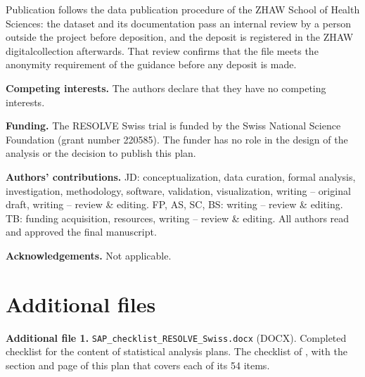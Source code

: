 \documentclass[11pt,a4paper]{article}
\begin{document}
Publication follows the data publication procedure of the ZHAW School of
Health Sciences: the dataset and its documentation pass an internal review
by a person outside the project before deposition, and the deposit is
registered in the ZHAW digitalcollection afterwards. That review confirms
that the file meets the anonymity requirement of the guidance before any
deposit is made.

\textbf{Competing interests.} The authors declare that they have no
competing interests.

\textbf{Funding.} The RESOLVE Swiss trial is funded by the Swiss National
Science Foundation (grant number 220585). The funder has no role in the
design of the analysis or the decision to publish this plan.

\textbf{Authors' contributions.} JD: conceptualization, data curation, formal
analysis, investigation, methodology, software, validation, visualization,
writing -- original draft, writing -- review \& editing. FP, AS, SC, BS:
writing -- review \& editing. TB: funding acquisition, resources,
writing -- review \& editing. All authors read and approved the final
manuscript.

\textbf{Acknowledgements.} Not applicable.

\section*{Additional files}

\noindent
\textbf{Additional file 1.} \texttt{SAP\_checklist\_RESOLVE\_Swiss.docx}
(DOCX). Completed checklist for the content of statistical analysis plans.
The checklist of \citet{gamble2017}, with the section and page of this plan
that covers each of its 54 items.

\clearpage


\end{document}
